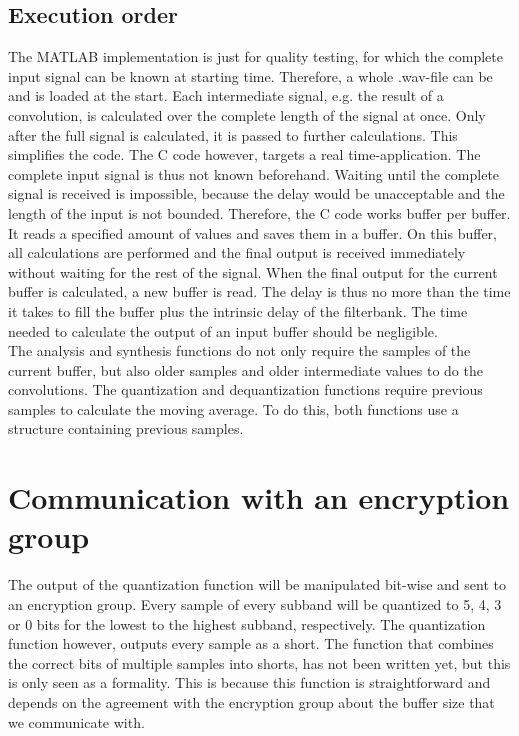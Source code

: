 \documentclass[a4paper]{article}
\begin{document}
\subsection{Execution order}
The MATLAB implementation is just for quality testing, for which the complete input signal can be known at starting time. Therefore, a whole .wav-file can be and is loaded at the start. Each intermediate signal, e.g. the result of a convolution, is calculated over the complete length of the signal at once. Only after the full signal is calculated, it is passed to further calculations. This simplifies the code. The C code however, targets a real time-application. The complete input signal is thus not known beforehand. Waiting until the complete signal is received is impossible, because the delay would be unacceptable and the length of the input is not bounded. Therefore, the C code works buffer per buffer. It reads a specified amount of values and saves them in a buffer. On this buffer, all calculations are performed and the final output is received immediately without waiting for the rest of the signal. When the final output for the current buffer is calculated, a new buffer is read. The delay is thus no more than the time it takes to fill the buffer plus the intrinsic delay of the filterbank. The time needed to calculate the output of an input buffer should be negligible. \\

The analysis and synthesis functions do not only require the samples of the current buffer, but also older samples and older intermediate values to do the convolutions. The quantization and dequantization functions require previous samples to calculate the moving average. To do this, both functions use a structure containing previous samples.

\section{Communication with an encryption group}\label{sec:communication}
The output of the quantization function will be manipulated bit-wise  and sent to an encryption group. Every sample of every subband will be quantized to 5, 4, 3 or 0 bits for the lowest to the highest subband, respectively. The quantization function however, outputs every sample as a short. The function that combines the correct bits of multiple samples into shorts, has not been written yet, but this is only seen as a formality. This is because this function is straightforward and depends on the agreement with the encryption group about the buffer size that we communicate with.
\end{document}
